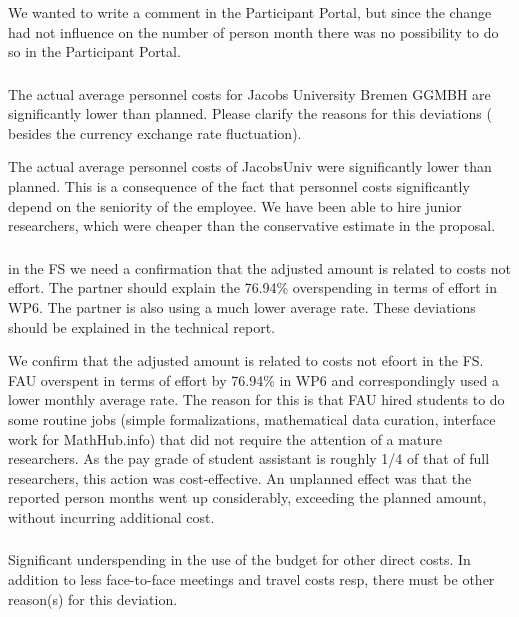 \begin{EUcomment}
We wanted to write a comment in the Participant Portal, but since the change had not influence on the number of person month there was no possibility to do so in the Participant Portal.

\subsubsection{}

\begin{EUcomment}
  The actual average personnel costs for Jacobs University Bremen GGMBH are significantly lower than planned. Please
  clarify the reasons for this deviations ( besides the currency exchange rate fluctuation).
\end{EUcomment}

The actual average personnel costs of JacobsUniv were significantly
lower than planned. This is a consequence of the fact that personnel
costs significantly depend on the seniority of the employee. We have
been able to hire junior researchers, which were cheaper than the
conservative estimate in the proposal.

\subsubsection{}

\begin{EUcomment}
in the FS we need a confirmation that the adjusted amount is related to costs not effort. 
The partner should explain the 76.94\% overspending in terms of effort in WP6. The partner is
also using a much lower average rate. These deviations should be explained in the technical report.
\end{EUcomment}

We confirm that the adjusted amount is related to costs not efoort in the FS.
FAU overspent in terms of effort by 76.94\% in WP6 and correspondingly used a lower monthly
average rate. The reason for this is that FAU hired students to do some routine jobs
(simple formalizations, mathematical data curation, interface work for MathHub.info) that
did not require the attention of a mature researchers. As the pay grade of student
assistant is roughly 1/4 of that of full researchers, this action was cost-effective. An
unplanned effect was that the reported person months went up considerably, exceeding the
planned amount, without incurring additional cost.


\subsubsection{}
\begin{EUcomment}
  Significant underspending in the use of the budget for other direct
  costs. In addition to less face-to-face meetings and travel costs
  resp, there must be other reason(s) for this deviation.
\end{EUcomment}


\end{EUcomment}
